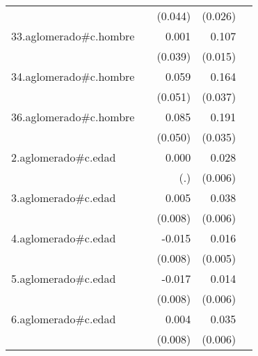 {\begin{longtable}{l*{4}{D{.}{.}{-1}}}
            &                     &     (0.044)         &     (0.026)         &                     \\
\addlinespace
33.aglomerado#c.hombre&                     &       0.001         &       0.107\sym{***}&                     \\
            &                     &     (0.039)         &     (0.015)         &                     \\
\addlinespace
34.aglomerado#c.hombre&                     &       0.059         &       0.164\sym{***}&                     \\
            &                     &     (0.051)         &     (0.037)         &                     \\
\addlinespace
36.aglomerado#c.hombre&                     &       0.085         &       0.191\sym{***}&                     \\
            &                     &     (0.050)         &     (0.035)         &                     \\
\addlinespace
2.aglomerado#c.edad&                     &       0.000         &       0.028\sym{***}&                     \\
            &                     &         (.)         &     (0.006)         &                     \\
\addlinespace
3.aglomerado#c.edad&                     &       0.005         &       0.038\sym{***}&                     \\
            &                     &     (0.008)         &     (0.006)         &                     \\
\addlinespace
4.aglomerado#c.edad&                     &      -0.015         &       0.016\sym{**} &                     \\
            &                     &     (0.008)         &     (0.005)         &                     \\
\addlinespace
5.aglomerado#c.edad&                     &      -0.017\sym{*}  &       0.014\sym{*}  &                     \\
            &                     &     (0.008)         &     (0.006)         &                     \\
\addlinespace
6.aglomerado#c.edad&                     &       0.004         &       0.035\sym{***}&                     \\
            &                     &     (0.008)         &     (0.006)         &                     \\

\end{longtable}}
